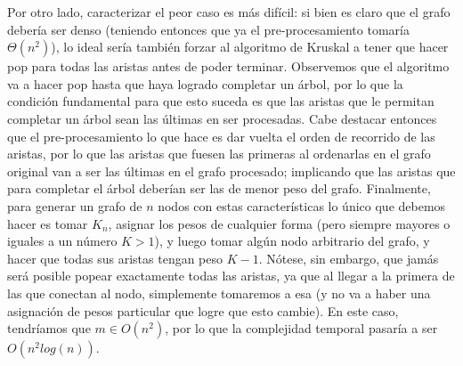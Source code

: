 \documentclass{article}
\theoremstyle{definition}
\theoremstyle{remark}
\begin{document}
Por otro lado, caracterizar el peor caso es más difícil: si bien es claro que el grafo debería ser denso (teniendo entonces que ya el pre-procesamiento tomaría $\Theta(n^2)$), lo ideal sería también forzar al algoritmo de Kruskal a tener que hacer pop para todas las aristas antes de poder terminar. Observemos que el algoritmo va a hacer pop hasta que haya logrado completar un árbol, por lo que la condición fundamental para que esto suceda es que las aristas que le permitan completar un árbol sean las últimas en ser procesadas. Cabe destacar entonces que el pre-procesamiento lo que hace es dar vuelta el orden de recorrido de las aristas, por lo que las aristas que fuesen las primeras al ordenarlas en el grafo original van a ser las últimas en el grafo procesado; implicando que las aristas que para completar el árbol deberían ser las de menor peso del grafo. Finalmente, para generar un grafo de $n$ nodos con estas características lo único que debemos hacer es tomar $K_n$, asignar los pesos de cualquier forma (pero siempre mayores o iguales a un número $K > 1$), y luego tomar algún nodo arbitrario del grafo, y hacer que todas sus aristas tengan peso $K - 1$. Nótese, sin embargo, que jamás será posible popear exactamente todas las aristas, ya que al llegar a la primera de las que conectan al nodo, simplemente tomaremos a esa (y no va a haber una asignación de pesos particular que logre que esto cambie). En este caso, tendríamos que $m \in O(n^2)$, por lo que la complejidad temporal pasaría a ser $O(n^2 log(n))$.
\end{document}
